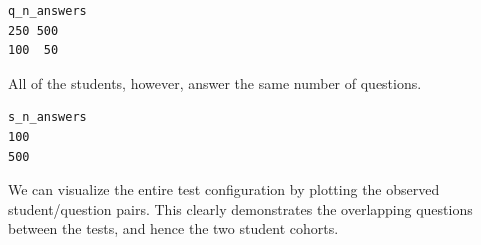 \documentclass[
  letterpaper,
  DIV=11,
  numbers=noendperiod]{scrartcl}
\newenvironment{Shaded}{\begin{snugshade}}{\end{snugshade}}
\newcommand{\ControlFlowTok}[1]{\textcolor[rgb]{0.00,0.23,0.31}{#1}}
\newcommand{\DecValTok}[1]{\textcolor[rgb]{0.68,0.00,0.00}{#1}}
\newcommand{\FunctionTok}[1]{\textcolor[rgb]{0.28,0.35,0.67}{#1}}
\newcommand{\NormalTok}[1]{\textcolor[rgb]{0.00,0.23,0.31}{#1}}
\newcommand{\OtherTok}[1]{\textcolor[rgb]{0.00,0.23,0.31}{#1}}
\newcommand{\SpecialCharTok}[1]{\textcolor[rgb]{0.37,0.37,0.37}{#1}}
\begin{document}
\begin{Shaded}
\end{Shaded}

\begin{verbatim}
q_n_answers
250 500 
100  50 
\end{verbatim}

All of the students, however, answer the same number of questions.

\begin{Shaded}
\end{Shaded}

\begin{verbatim}
s_n_answers
100 
500 
\end{verbatim}

We can visualize the entire test configuration by plotting the observed
student/question pairs. This clearly demonstrates the overlapping
questions between the tests, and hence the two student cohorts.
\end{document}
